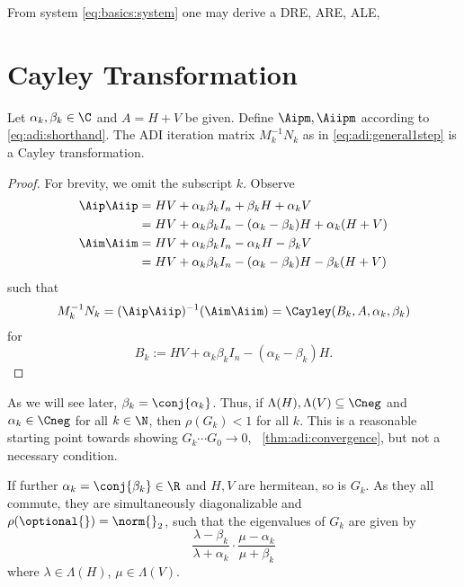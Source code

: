 From system \eqref{eq:basics:system} one may derive a \ac{DRE}, \ac{ARE}, \ac{ALE}, \etc

\section{Cayley Transformation}

\begin{lemma}
  Let $\alpha_k,\beta_k\in\C$ and $A=H+V$ be given.
  Define $\Aipm, \Aiipm$ according to \eqref{eq:adi:shorthand}.
  The \ac{ADI} iteration matrix $M_k^{-1}N_k$ as in \eqref{eq:adi:general1step} is a Cayley transformation.
\end{lemma}
\begin{proof}
  For brevity, we omit the subscript $k$.
  Observe
  \begin{align*}
    \Aip\Aiip
    &= HV + \alpha_k\beta_k I_n + \beta_k H + \alpha_k V \\
    &= HV + \alpha_k\beta_k I_n - (\alpha_k-\beta_k)H + \alpha_k(H+V) \\
    \Aim\Aiim
    &= HV + \alpha_k\beta_k I_n - \alpha_k H - \beta_k V \\
    &= HV + \alpha_k\beta_k I_n - (\alpha_k-\beta_k)H - \beta_k(H+V)
  \end{align*}
  such that
  \begin{equation*}
    M_k^{-1} N_k
    = (\Aip\Aiip)^{-1}(\Aim\Aiim)
    = \Cayley(B_k, A, \alpha_k, \beta_k)
  \end{equation*}
  for
  \begin{equation*}
    B_k := HV + \alpha_k\beta_k I_n - (\alpha_k-\beta_k)H
    .
  \end{equation*}
\end{proof}

As we will see later, $\beta_k = \conj{\alpha_k}$.
Thus, if $\Lambda(H), \Lambda(V) \subseteq \Cneg$
and $\alpha_k \in \Cneg$ for all $k\in\N$, then $\rho(G_k) < 1$ for all $k$.
This is a reasonable starting point towards showing $G_k\cdots G_0 \to 0$,
\cf~\autoref{thm:adi:convergence},
but not a necessary condition.

If further $\alpha_k = \conj{\beta_k} \in\R$ and $H,V$ are hermitean, so is $G_k$.
As they all commute,
they are simultaneously diagonalizable and $\rho(\optional{}) = \norm{}_2$,
such that the eigenvalues of $G_k$ are given by
\begin{equation}
  \frac{\lambda - \beta_k}{\lambda + \alpha_k}
  \cdot
  \frac{\mu - \alpha_k}{\mu + \beta_k}
\end{equation}
where $\lambda \in \Lambda(H)$, $\mu\in\Lambda(V)$.

